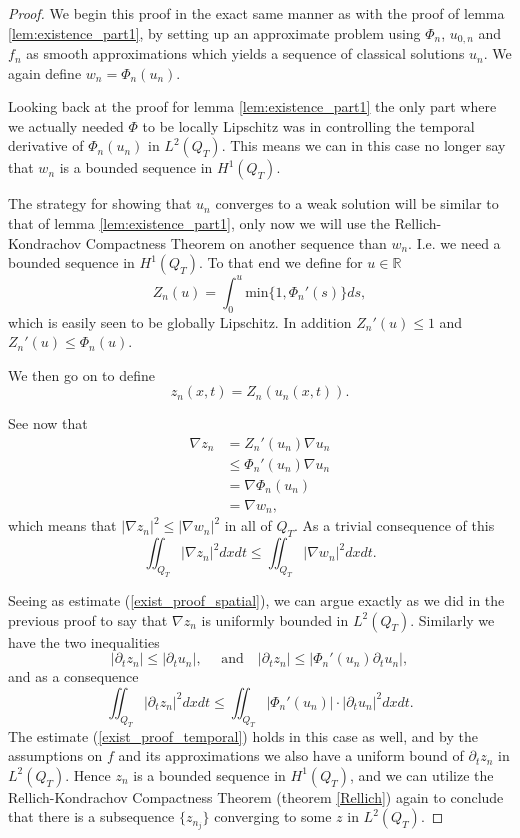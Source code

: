 \documentclass[11pt, a4paper]{article}
\begin{document}
\begin{proof}
We begin this proof in the exact same manner as with the proof of lemma \ref{lem:existence_part1}, by setting up an approximate problem using $\Phi_n$, $u_{0,n}$ and $f_n$ as smooth approximations which yields a sequence of classical solutions $u_n$. We again define $w_n = \Phi_n(u_n)$.

Looking back at the proof for lemma \ref{lem:existence_part1} the only part where we actually needed $\Phi$ to be locally Lipschitz was in controlling the temporal derivative of $\Phi_n(u_n)$ in $L^2(Q_T)$. This means we can in this case no longer say that $w_n$ is a bounded sequence in $H^1(Q_T)$.

The strategy for showing that $u_n$ converges to a weak solution will be similar to that of lemma \ref{lem:existence_part1}, only now we will use the Rellich-Kondrachov Compactness Theorem on another sequence than $w_n$. I.e. we need a bounded sequence in $H^1(Q_T)$. To that end we define for $u \in \mathbb{R}$
\begin{equation}
Z_n(u) = \int_0^u \mathrm{min}\{1, \Phi_n'(s)\} ds,
\end{equation}
which is easily seen to be globally Lipschitz. In addition $Z_n'(u) \leq 1$ and $Z_n'(u) \leq \Phi_n(u)$.

We then go on to define
\begin{equation}
z_n(x,t) = Z_n(u_n(x,t)).
\end{equation}

See now that
\begin{align*}
\nabla z_n &= Z_n'(u_n)\nabla u_n \\
	&\leq \Phi_n'(u_n)\nabla u_n \\
	&= \nabla \Phi_n(u_n) \\
	&= \nabla w_n,
\end{align*}
which means that $|\nabla z_n|^2 \leq |\nabla w_n|^2$ in all of $Q_T$. As a trivial consequence of this
\begin{equation*}
\iint_{Q_T}|\nabla z_n|^2dxdt \leq \iint_{Q_T}|\nabla w_n|^2dxdt.
\end{equation*}

Seeing as estimate (\ref{exist_proof_spatial}), we can argue exactly as we did in the previous proof to say that $\nabla z_n$ is uniformly bounded in $L^2(Q_T)$.
Similarly we have the two inequalities
\begin{equation*}
|\partial_t z_n | \leq |\partial_t u_n|, \quad \text{ and} \quad |\partial_t z_n| \leq |\Phi_n'(u_n) \partial_t u_n|,
\end{equation*}
and as a consequence
\begin{equation*}
\iint_{Q_T}|\partial_t z_n|^2 dxdt \leq \iint_{Q_T} |\Phi_n'(u_n)|\cdot |\partial_t u_n|^2dxdt.
\end{equation*}
The estimate (\ref{exist_proof_temporal}) holds in this case as well, and by the assumptions on $f$ and its approximations we also have a uniform bound of $\partial_t z_n$ in $L^2(Q_T)$. Hence $z_n$ is a bounded sequence in $H^1(Q_T)$, and we can utilize the Rellich-Kondrachov Compactness Theorem (theorem \ref{Rellich}) again to conclude that there is a subsequence $\{z_{n_j}\}$ converging to some $z$ in $L^2(Q_T)$.


\end{proof}
\end{document}
